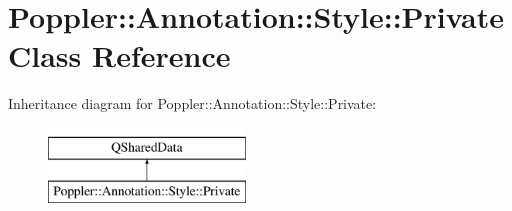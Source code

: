 \hypertarget{class_poppler_1_1_annotation_1_1_style_1_1_private}{}\section{Poppler\+:\+:Annotation\+:\+:Style\+:\+:Private Class Reference}
\label{class_poppler_1_1_annotation_1_1_style_1_1_private}
Inheritance diagram for Poppler\+:\+:Annotation\+:\+:Style\+:\+:Private\+:\begin{figure}[H]
\begin{center}
\leavevmode
\includegraphics[height=2.000000cm]{class_poppler_1_1_annotation_1_1_style_1_1_private}
\end{center}
\end{figure}
